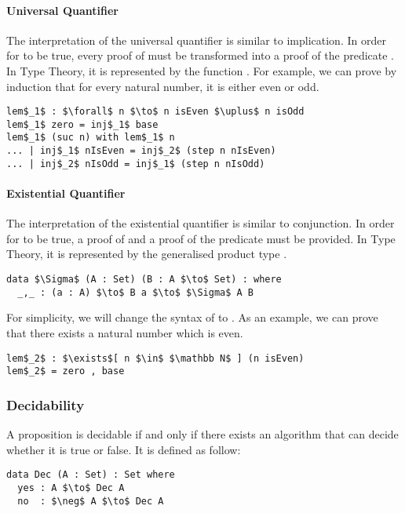 \paragraph{Universal Quantifier} The interpretation of the universal quantifier is similar to
implication. In order for  to be true, every
proof  of  must be transformed into a proof of the predicate
. In Type Theory, it is represented by the function . For example, we can prove by induction that for every natural
number, it is either even or odd.
\begin{lstlisting}[mathescape=true,xleftmargin=.3\textwidth]
lem$_1$ : $\forall$ n $\to$ n isEven $\uplus$ n isOdd
lem$_1$ zero = inj$_1$ base
lem$_1$ (suc n) with lem$_1$ n
... | inj$_1$ nIsEven = inj$_2$ (step n nIsEven)
... | inj$_2$ nIsOdd = inj$_1$ (step n nIsOdd)
\end{lstlisting} 

\paragraph{Existential Quantifier} The interpretation of the
existential quantifier is similar to conjunction. In order for
 to be true, a proof
 of  and a proof  of the predicate
 must be provided. In Type Theory, it is represented by the generalised
product type \mb{\Sigma}. 
\begin{lstlisting}[mathescape=true,xleftmargin=.3\textwidth]
data $\Sigma$ (A : Set) (B : A $\to$ Set) : where
  _,_ : (a : A) $\to$ B a $\to$ $\Sigma$ A B
\end{lstlisting}
\par For simplicity, we will change the syntax of \mb{\Sigma} to
. As an example, we can prove that
there exists a natural number which is even. 
\begin{lstlisting}[mathescape=true,xleftmargin=.3\textwidth]
lem$_2$ : $\exists$[ n $\in$ $\mathbb N$ ] (n isEven)
lem$_2$ = zero , base
\end{lstlisting}


\subsubsection{Decidability} 
\par A proposition  is decidable if and only if there
exists an algorithm that can decide whether it is true or false. It is
defined as follow: 
\begin{lstlisting}[mathescape=true,xleftmargin=.3\textwidth]
data Dec (A : Set) : Set where
  yes : A $\to$ Dec A
  no  : $\neg$ A $\to$ Dec A
\end{lstlisting}

